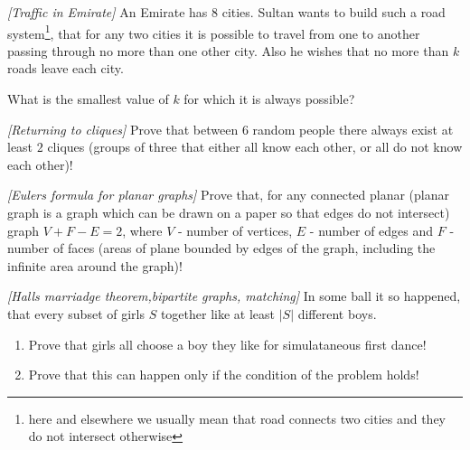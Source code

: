 

%



\noindent 


\begin{problem}
\textit{[Traffic in Emirate]}
An Emirate has 8 cities. Sultan wants to build such a road system\footnote{here and elsewhere we usually mean that road connects two cities and they do not intersect otherwise}, that for any two cities it is possible to travel from one to another passing through no more than one other city. Also he wishes that no more than $k$ roads leave each city.

 What is the smallest value of $k$ for which it is always possible?
\end{problem}
%

\begin{problem}
\textit{[Returning to cliques]}
Prove that between $6$ random people there always exist at least $2$ cliques (groups of three that either all know each other, or all do not know each other)!
\end{problem}
%

\begin{problem}
\textit{[Eulers formula for planar graphs]}
Prove that, for any connected planar (planar graph is a graph which can be drawn on a paper so that edges do not intersect) graph $V+F-E=2$, where $V$ - number of vertices, $E$ - number of edges and $F$ - number of faces (areas of plane bounded by edges of the graph, including the infinite area around the graph)!
\end{problem}


\begin{problem}
\textit{[Halls marriadge theorem,bipartite graphs, matching]}
In some ball it so happened, that every subset of girls $S$ together like at least  $|S|$ different boys.
\begin {enumerate}
\item Prove that girls all choose a boy they like for simulataneous first dance!

\item Prove that this can happen only if the condition of the problem holds!
\end {enumerate}
\end{problem}



